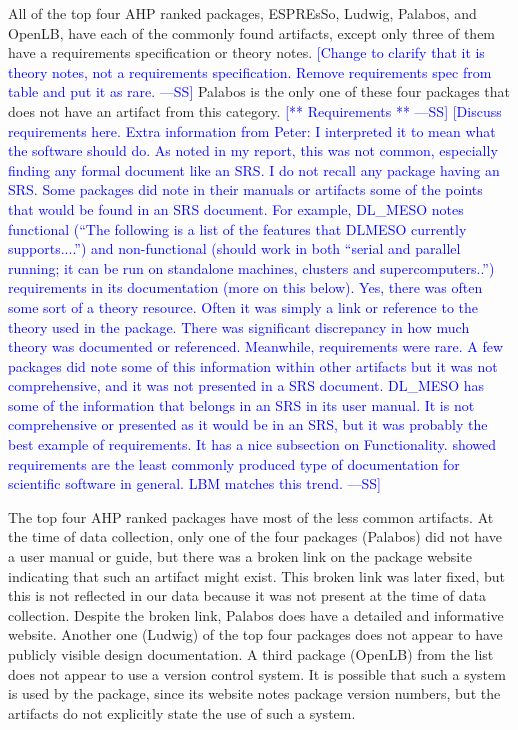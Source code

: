 \documentclass[final, 3p, times, authoryear]{elsarticle}
\newcommand{\authornote}[3]{\textcolor{#1}{[#3 ---#2]}}
\newcommand{\authornote}[3]{}
\newcommand{\wss}[1]{\authornote{blue}{SS}{#1}} %
\begin{document}
All of the top four AHP ranked packages, ESPREsSo, Ludwig, Palabos, and OpenLB,
have each of the commonly found artifacts, except only three of them have a
requirements specification or theory notes. \wss{Change to clarify that it is
theory notes, not a requirements specification.  Remove requirements spec from
table and put it as rare.}  Palabos is the only one of these four packages that
does not have an artifact from this category.  \wss{** Requirements **}
\wss{Discuss requirements here. Extra information from Peter: I interpreted it
to mean what the software should do. As noted in my report, this was not common,
especially finding any formal document like an SRS. I do not recall any package
having an SRS. Some packages did note in their manuals or artifacts some of the
points that would be found in an SRS document. For example, DL\_MESO notes
functional (``The following is a list of the features that DLMESO currently
supports....'') and non-functional (should work in both ``serial and parallel
running; it can be run on standalone machines, clusters and supercomputers..'')
requirements in its documentation (more on this below). Yes, there was often
some sort of a theory resource. Often it was simply a link or reference to the
theory used in the package. There was significant discrepancy in how much theory
was documented or referenced. Meanwhile, requirements were rare. A few packages
did note some of this information within other artifacts but it was not
comprehensive, and it was not presented in a SRS document. DL\_MESO has some of
the information that belongs in an SRS in its user manual. It is not
comprehensive or presented as it would be in an SRS, but it was probably the
best example of requirements. It has a nice subsection on Functionality.
\citet{Nguyen-HoanEtAl2010} showed requirements are the least commonly produced
type of documentation for scientific software in general.  LBM matches this
trend.}

The top four AHP ranked packages have most of the less common artifacts. At the
time of data collection, only one of the four packages (Palabos) did not have a
user manual or guide, but there was a broken link on the package website
indicating that such an artifact might exist. This broken link was later fixed,
but this is not reflected in our data because it was not present at the time of
data collection. Despite the broken link, Palabos does have a detailed and
informative website. Another one (Ludwig) of the top four packages does not
appear to have publicly visible design documentation. A third package (OpenLB)
from the list does not appear to use a version control system. It is possible
that such a system is used by the package, since its website notes package
version numbers, but the artifacts do not explicitly state the use of such a
system.
\end{document}
